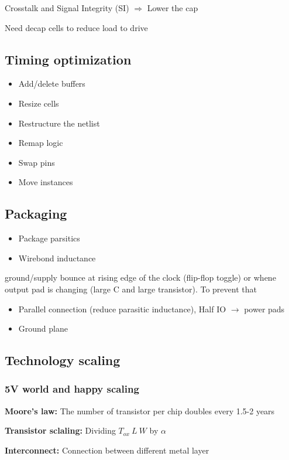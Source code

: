 Crosstalk and Signal Integrity (SI) \(\Rightarrow\) Lower the cap



Need decap cells to reduce load to drive 

\subsection{Timing optimization}
\begin{itemize}
  \item Add/delete buffers
  \item Resize cells
  \item Restructure the netlist
  \item Remap logic
  \item Swap pins
  \item Move instances
\end{itemize}

\subsection{Packaging}
\begin{itemize}
  \item Package parsitics
  \item Wirebond inductance
\end{itemize}
ground/supply bounce at rising edge of the clock (flip-flop toggle) or whene output pad is changing (large C and large transistor). To prevent that
\begin{itemize}
  \item Parallel connection (reduce parasitic inductance), Half IO \(\rightarrow\) power pads
  \item Ground plane
\end{itemize}


\subsection{Technology scaling}

\subsubsection{5V world and happy scaling}
\textbf{Moore's law:} The number of transistor per chip doubles every 1.5-2 years

\textbf{Transistor sclaling:} Dividing \(T_{ox}\ L\ W\) by \(\alpha\)

\textbf{Interconnect:} Connection between different metal layer %

